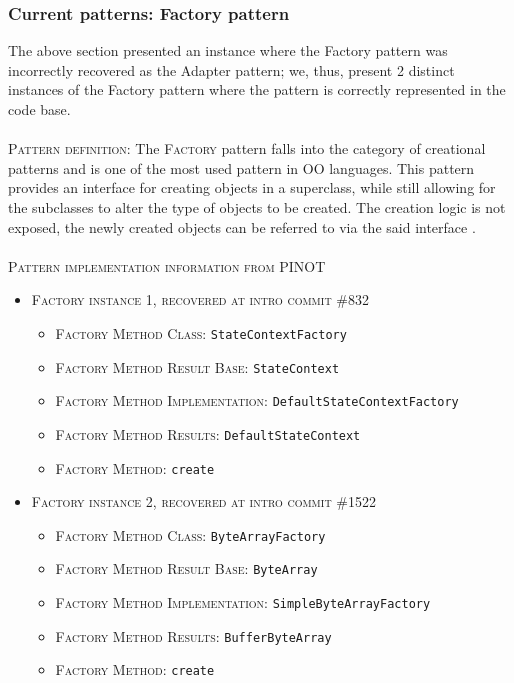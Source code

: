 \subsubsection{Current patterns: Factory pattern}
The above section presented an instance where the Factory pattern was incorrectly recovered as the Adapter pattern; we, thus, present 2 distinct instances of the Factory pattern where the pattern is correctly represented in the code base.\\\\
\textsc{Pattern definition}: The \textsc{Factory} pattern falls into the category of creational patterns and is one of the most used pattern in OO languages. This pattern provides an interface for creating objects in a superclass, while still allowing for the subclasses to alter the type of objects to be created. The creation logic is not exposed, the newly created objects can be referred to via the said interface \cite{factory}\cite{factory1}.\\\\
\textsc{Pattern implementation information from PINOT}
\begin{itemize}
    \item \textsc{Factory instance 1, recovered at intro commit \#832}
        \begin{itemize}
            \item \textsc{Factory Method Class}: \texttt{StateContextFactory}
            \item \textsc{Factory Method Result Base}: \texttt{StateContext}
            \item \textsc{Factory Method Implementation}: \texttt{DefaultStateContextFactory}
            \item \textsc{Factory Method Results}: \texttt{DefaultStateContext}
            \item \textsc{Factory Method}: \texttt{create}
        \end{itemize}
    \item \textsc{Factory instance 2, recovered at intro commit \#1522}
          \begin{itemize}
            \item \textsc{Factory Method Class}: \texttt{ByteArrayFactory}
            \item \textsc{Factory Method Result Base}: \texttt{ByteArray}
            \item \textsc{Factory Method Implementation}: \texttt{SimpleByteArrayFactory}
            \item \textsc{Factory Method Results}: \texttt{BufferByteArray}
            \item \textsc{Factory Method}: \texttt{create}
        \end{itemize}
\end{itemize}
